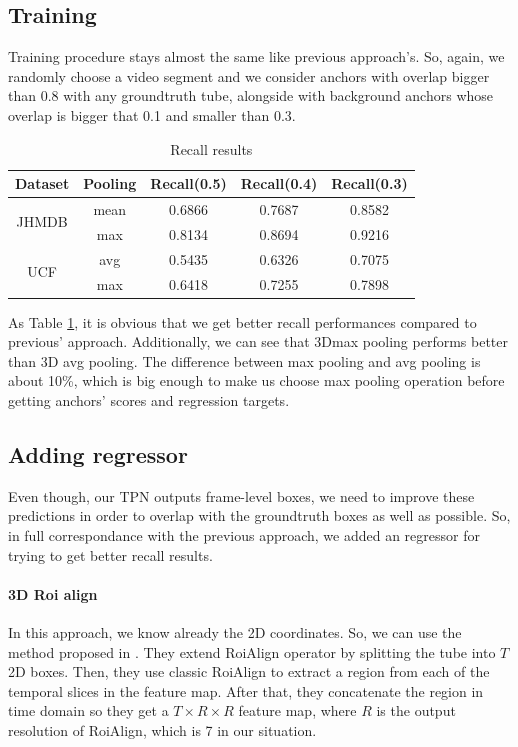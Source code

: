 \subsection{Training}
Training procedure stays almost the same like previous approach's. So, again, we randomly choose  a video segment and we consider anchors with overlap bigger than 0.8 with any groundtruth
tube, alongside with background anchors whose overlap is bigger that 0.1 and smaller than 0.3.

\begin{table}[h]
  \centering
  \begin{tabular}{||c | c || c  c c||}
    \hline
    \textbf{Dataset} & \textbf{Pooling} &  \textbf{Recall(0.5)} & \textbf{Recall(0.4)} & \textbf{Recall(0.3)} \\
    \hline  \hline
    \multirow{2}{4em}{JHMDB} & mean & 0.6866 & 0.7687 & 0.8582 \\
    \cline{2-5}
    {} & max &  0.8134 & 0.8694 & 0.9216 \\
    \hline
    \multirow{2}{4em}{UCF} & avg &  0.5435 & 0.6326 & 0.7075 \\
    \cline{2-5}
    {} & max & 0.6418 & 0.7255 & 0.7898 \\
    \hline
  \end{tabular}
  \caption{Recall results}
  \label{table:tpn_2_1}
\end{table}

As Table \ref{table:tpn_2_1}, it is obvious that we get better recall performances compared to previous' approach.
Additionally, we can see that 3Dmax pooling performs better than  3D avg pooling. The difference
between max pooling and avg pooling is about 10\%, which is big enough to make us choose max pooling operation before getting anchors' scores
and regression targets.

\subsection{Adding regressor}

Even though, our TPN outputs frame-level boxes, we need to improve these predictions in order to overlap
with the groundtruth boxes as well as possible.
So, in full correspondance with the previous approach, we added an regressor for trying to get better recall results.

\paragraph{3D Roi align}
In this approach, we know already the 2D coordinates. So, we can use the method proposed in \cite{DBLP:journals/corr/abs-1712-09184}. They
extend RoiAlign operator by splitting the tube into $T$ 2D boxes. Then, they use classic RoiAlign to extract a region from each
of the temporal slices in the feature map. After that, they concatenate the region in time domain so they get a $T \times R \times R$
feature map, where $R$ is the output resolution of RoiAlign, which is 7 in our situation. \par

